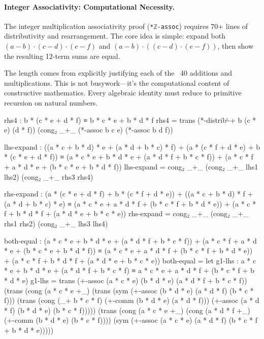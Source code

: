 \documentclass[11pt,a4paper]{book}
\begin{document}
\paragraph{Integer Associativity: Computational Necessity.}
The integer multiplication associativity proof (\texttt{*ℤ-assoc}) requires 70+ lines 
of distributivity and rearrangement. The core idea is simple: expand both 
$(a - b) \cdot (c - d) \cdot (e - f)$ and $(a - b) \cdot ((c - d) \cdot (e - f))$, 
then show the resulting 12-term sums are equal.

The length comes from explicitly justifying each of the ~40 additions and multiplications. 
This is not busywork—it's the computational content of constructive mathematics. Every 
algebraic identity must reduce to primitive recursion on natural numbers.

\begin{code}        
        rhs4 : b * (c * e + d * f) ≡ b * c * e + b * d * f
        rhs4 = trans (*-distribˡ-+ b (c * e) (d * f)) (cong₂ _+_ (*-assoc b c e) (*-assoc b d f))
        
        lhs-expand : ((a * c + b * d) * e + (a * d + b * c) * f) + (a * (c * f + d * e) + b * (c * e + d * f))
                   ≡ (a * c * e + b * d * e + (a * d * f + b * c * f)) + (a * c * f + a * d * e + (b * c * e + b * d * f))
        lhs-expand = cong₂ _+_ (cong₂ _+_ lhs1 lhs2) (cong₂ _+_ rhs3 rhs4)
        
        rhs-expand : (a * (c * e + d * f) + b * (c * f + d * e)) + ((a * c + b * d) * f + (a * d + b * c) * e)
                   ≡ (a * c * e + a * d * f + (b * c * f + b * d * e)) + (a * c * f + b * d * f + (a * d * e + b * c * e))
        rhs-expand = cong₂ _+_ (cong₂ _+_ rhs1 rhs2) (cong₂ _+_ lhs3 lhs4)
        
        both-equal : (a * c * e + b * d * e + (a * d * f + b * c * f)) + (a * c * f + a * d * e + (b * c * e + b * d * f))
                   ≡ (a * c * e + a * d * f + (b * c * f + b * d * e)) + (a * c * f + b * d * f + (a * d * e + b * c * e))
        both-equal = 
          let 
            g1-lhs : a * c * e + b * d * e + (a * d * f + b * c * f)
                   ≡ a * c * e + a * d * f + (b * c * f + b * d * e)
            g1-lhs = trans (+-assoc (a * c * e) (b * d * e) (a * d * f + b * c * f))
                     (trans (cong (a * c * e +_) (trans (sym (+-assoc (b * d * e) (a * d * f) (b * c * f)))
                            (trans (cong (_+ b * c * f) (+-comm (b * d * e) (a * d * f)))
                            (+-assoc (a * d * f) (b * d * e) (b * c * f)))))
                     (trans (cong (a * c * e +_) (cong (a * d * f +_) (+-comm (b * d * e) (b * c * f))))
                     (sym (+-assoc (a * c * e) (a * d * f) (b * c * f + b * d * e)))))
            

\end{code}
\end{document}

